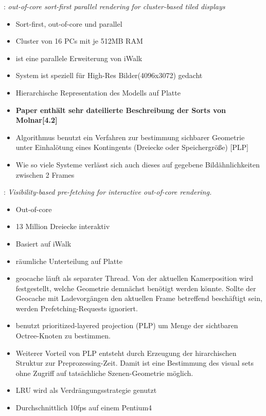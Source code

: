 \cite{wagner1}: \textit{out-of-core sort-first parallel rendering for cluster-based tiled displays}
\begin{itemize}
 \item Sort-first, out-of-core und parallel
 \item Cluster von 16 PCs mit je 512MB RAM
 \item ist eine parallele Erweiterung von iWalk
 \item System ist speziell für High-Res Bilder(4096x3072) gedacht
 \item Hierarchische Representation des Modells auf Platte
 \item \textbf{Paper enthält sehr dateilierte Beschreibung der Sorts von Molnar[4.2]}
 \item Algorithmus benutzt ein Verfahren zur bestimmung sichbarer Geometrie unter Einhalötung eines Kontingents (Dreiecke oder Speichergröße) [PLP]
 \item Wie so viele Systeme verlässt sich auch dieses auf gegebene Bildähnlichkeiten zwischen 2 Frames
\end{itemize}

\cite{wagner2}: \textit{Visibility-based pre-fetching for interactive out-of-core rendering.}
\begin{itemize}
 \item Out-of-core
 \item 13 Million Dreiecke interaktiv
 \item Basiert auf iWalk
 \item räumliche Unterteilung auf Platte
 \item geocache läuft als separater Thread. Von der aktuellen Kamerposition wird festgestellt, welche Geometrie demnächst benötigt werden könnte. Sollte der Geocache mit Ladevorgängen den aktuellen Frame betreffend beschäftigt sein, werden Prefetching-Requests ignoriert.
 \item benutzt prioritized-layered projection (PLP) um Menge der sichtbaren Octree-Knoten zu bestimmen.
 \item Weiterer Vorteil von PLP entsteht durch Erzeugung der hirarchischen Struktur zur Preprozessing-Zeit. Damit ist eine Bestimmung des visual sets ohne Zugriff auf tatsächliche Szenen-Geometrie möglich.
 \item LRU wird als Verdrängungsstrategie genutzt
 \item Durchschnittlich 10fps auf einem Pentium4
\end{itemize}

